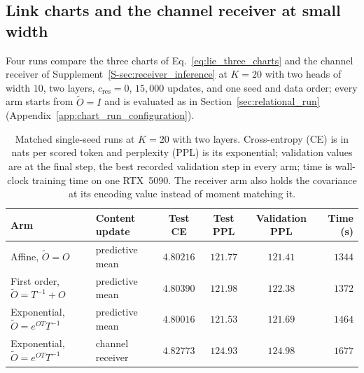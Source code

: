\documentclass[twoside,11pt]{article}
\begin{document}
\subsection{Link charts and the channel receiver at small width}
\label{sec:chart_runs}

Four runs compare the three charts of Eq.~\eqref{eq:lie_three_charts} and the channel receiver of Supplement~\ref{S-sec:receiver_inference} at $K=20$ with two heads of width $10$, two layers, $c_{\mathrm{res}}=0$, $15{,}000$ updates, and one seed and data order; every arm starts from $\widetilde O=I$ and is evaluated as in Section~\ref{sec:relational_run} (Appendix~\ref{app:chart_run_configuration}).

\begin{table}[ht]
\centering
\small
\begin{tabular}{@{}llcccr@{}}
\toprule
Arm & Content update & Test CE & Test PPL & Validation PPL & Time (s) \\
\midrule
Affine, $\widetilde O=O$ & predictive mean & $4.80216$ & $121.77$ & $121.41$ & $1344$ \\
First order, $\widetilde O=T^{-1}+O$ & predictive mean & $4.80390$ & $121.98$ & $122.38$ & $1372$ \\
Exponential, $\widetilde O=e^{OT}T^{-1}$ & predictive mean & $4.80016$ & $121.53$ & $121.69$ & $1464$ \\
Exponential, $\widetilde O=e^{OT}T^{-1}$ & channel receiver & $4.82773$ & $124.93$ & $124.98$ & $1677$ \\
\bottomrule
\end{tabular}
\caption{Matched single-seed runs at $K=20$ with two layers. Cross-entropy (CE) is in nats per scored token and perplexity (PPL) is its exponential; validation values are at the final step, the best recorded validation step in every arm; time is wall-clock training time on one RTX~5090. The receiver arm also holds the covariance at its encoding value instead of moment matching it.}
\label{tab:chart_runs}
\end{table}
\end{document}
